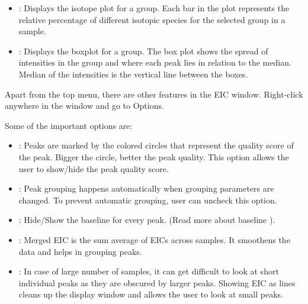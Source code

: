 \documentclass[letterpaper,10pt,english,openany,oneside]{sphinxmanual}
\begin{document}
\begin{itemize}
\item {} 
 : Displays the isotope plot for a group. Each bar in the plot represents the relative percentage of different isotopic species for the selected group in a sample.

\end{itemize}

\begin{itemize}
\item {} 
 : Displays the boxplot for a group. The box plot shows the spread of intensities in the group and where each peak lies in relation to the median. Median of the intensities is the vertical line between the boxes.

\end{itemize}

Apart from the top menu, there are other features in the EIC window. Right-click anywhere in the window and go to Options.


Some of the important options are:
\begin{itemize}
\item {} 
: Peaks are marked by the colored circles that represent the quality score of the peak. Bigger the circle, better the peak quality. This option allows the user to show/hide the peak quality score.

\item {} 
: Peak grouping happens automatically when grouping parameters are changed. To prevent automatic grouping, user can uncheck this option.

\item {} 
: Hide/Show the baseline for every peak. (Read more about baseline ).

\item {} 
: Merged EIC is the sum average of EICs across samples. It smoothens the data and helps in grouping peaks.

\item {} 
: In case of large number of samples, it can get difficult to look at short individual peaks as they are obscured by larger peaks. Showing EIC as lines cleans up the display window and allows the user to look at small peaks.

\end{itemize}
\end{document}
